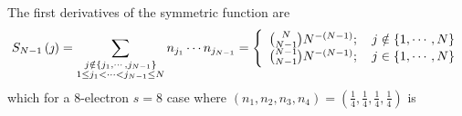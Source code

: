 \documentclass[aps,preprint]{revtex4}%
\begin{document}
The first derivatives of the symmetric function are
\begin{equation}
S_{N-1}\left(  \jmath\right)  =\sum_{\substack{j\notin\left\{  j_{1}%
,\cdots,j_{N-1}\right\}  \\1\leq j_{1}<\cdots<j_{N-1}\leq N}}n_{j_{1}}\cdots
n_{j_{N-1}}=\left\{
\begin{array}
[c]{c}%
\binom{N}{N-1}N^{-\left(  N-1\right)  };\quad j\notin\left\{  1,\cdots
,N\right\} \\
\binom{N-1}{N-1}N^{-\left(  N-1\right)  };\quad j\in\left\{  1,\cdots
,N\right\}
\end{array}
\right.
\end{equation}
which for a $8$-electron $s=8$ case where $\left(  n_{1},n_{2},n_{3}%
,n_{4}\right)  =\left(  \frac{1}{4},\frac{1}{4},\frac{1}{4},\frac{1}%
{4}\right)  $ is%
\end{document}
